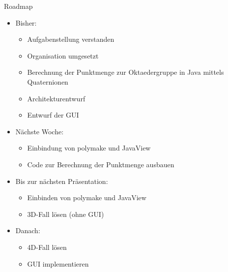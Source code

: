\documentclass[ucs,11pt]{beamer}
\begin{document}
\begin{frame}{Roadmap}
	\begin{itemize}
		\item Bisher:
			\begin{itemize}
				\item Aufgabenstellung verstanden
				\item Organisation umgesetzt
				\item Berechnung der Punktmenge zur Oktaedergruppe in Java mittels Quaternionen
				\item Architekturentwurf
				\item Entwurf der GUI
			\end{itemize} \pause
		\item Nächste Woche:
			\begin{itemize}
				\item Einbindung von polymake und JavaView
				\item Code zur Berechnung der Punktmenge ausbauen
			\end{itemize} \pause
		\item Bis zur nächsten Präsentation:
			\begin{itemize}
				\item Einbinden von polymake und JavaView
				\item 3D-Fall lösen (ohne GUI)
			\end{itemize} \pause
		\item Danach:
			\begin{itemize}
				\item 4D-Fall lösen
				\item GUI implementieren
			\end{itemize}
	\end{itemize}
\end{frame}
\end{document}

